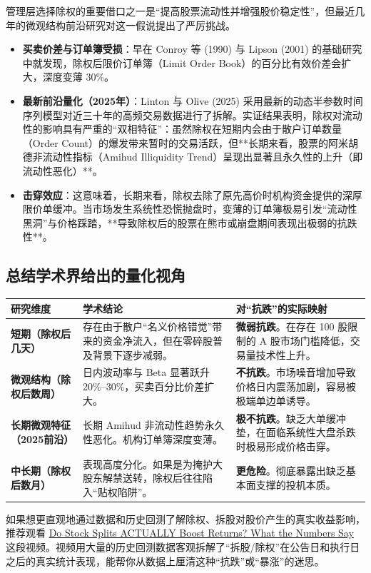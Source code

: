 \documentclass[a4paper,10pt]{article}
\begin{document}
管理层选择除权的重要借口之一是“提高股票流动性并增强股价稳定性”，但最近几年的微观结构前沿研究对这一假说提出了严厉挑战。

\begin{itemize}
    \item \textbf{买卖价差与订单簿受损}：早在 Conroy 等 (1990)\cite{ConroyHarrisBenet1990} 与 Lipson (2001)\cite{Lipson2001} 的基础研究中就发现，除权后限价订单簿（Limit Order Book）的百分比有效价差会扩大，深度变薄 30\%。
    \item \textbf{最新前沿量化（2025年）}：Linton 与 Olive (2025)\cite{LintonOlive2025} 采用最新的动态半参数时间序列模型对近三十年的高频交易数据进行了拆解。实证结果表明，除权对流动性的影响具有严重的“双相特征”：虽然除权在短期内会由于散户订单数量（Order Count）的爆发带来暂时的交易活跃，但**长期来看，股票的阿米胡德非流动性指标（Amihud Illiquidity Trend）呈现出显著且永久性的上升（即流动性恶化）**。
    \item \textbf{击穿效应}：这意味着，长期来看，除权去除了原先高价时机构资金提供的深厚限价单缓冲。当市场发生系统性恐慌抛盘时，变薄的订单簿极易引发“流动性黑洞”与价格踩踏，**导致除权后的股票在熊市或崩盘期间表现出极弱的抗跌性**。
\end{itemize}

\subsection{总结学术界给出的量化视角}

\begin{table}[h]
\centering
\begin{tabular}{|p{3.5cm}|p{6.5cm}|p{4.5cm}|}
\hline
\textbf{研究维度} & \textbf{学术结论} & \textbf{对“抗跌”的实际映射} \\
\hline
\textbf{短期（除权后几天）} & 存在由于散户“名义价格错觉”带来的资金净流入，但在零碎股普及背景下逐步减弱。 & \textbf{微弱抗跌}。在存在 100 股限制的 A 股市场门槛降低，交易量技术性上升。 \\
\hline
\textbf{微观结构（除权后数周）} & 日内波动率与 Beta 显著跃升 20\%--30\%，买卖百分比价差扩大。 & \textbf{不抗跌}。市场噪音增加导致价格日内震荡加剧，容易被极端单边单诱导。 \\
\hline
\textbf{长期微观特征（2025前沿）} & 长期 Amihud 非流动性趋势永久性恶化。机构订单簿深度变薄。 & \textbf{极不抗跌}。缺乏大单缓冲垫，在面临系统性大盘杀跌时极易形成价格击穿。 \\
\hline
\textbf{中长期（除权后数月）} & 表现高度分化。如果是为掩护大股东解禁送转，除权后往往陷入“贴权陷阱”。 & \textbf{更危险}。彻底暴露出缺乏基本面支撑的投机本质。 \\
\hline
\end{tabular}
\end{table}

如果想更直观地通过数据和历史回测了解除权、拆股对股价产生的真实收益影响，推荐观看 \href{https://www.youtube.com/watch?v=MgMTBNq7Bi4}{Do Stock Splits ACTUALLY Boost Returns? What the Numbers Say} 这段视频\cite{YouTube_StockSplits}。视频用大量的历史回测数据客观拆解了“拆股/除权”在公告日和执行日之后的真实统计表现，能帮你从数据上厘清这种“抗跌”或“暴涨”的迷思。

\printbibliography[heading=bibintoc]
\end{document}
